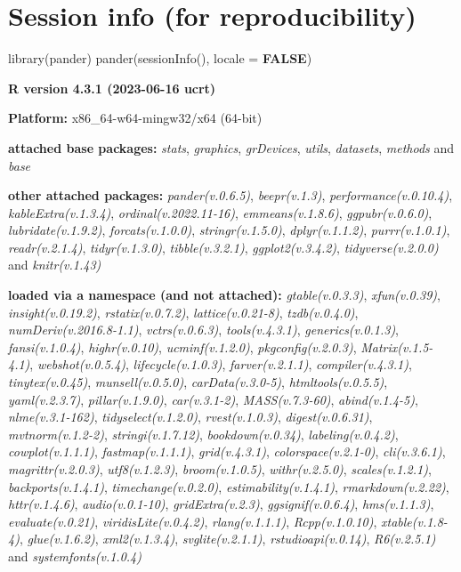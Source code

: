 \documentclass[
  bookmarksnumbered]{article}
\newenvironment{Shaded}{\begin{snugshade}}{\end{snugshade}}
\newcommand{\AttributeTok}[1]{\textcolor[rgb]{0.80,0.80,0.80}{#1}}
\newcommand{\ConstantTok}[1]{\textcolor[rgb]{0.86,0.64,0.64}{\textbf{#1}}}
\newcommand{\FunctionTok}[1]{\textcolor[rgb]{0.94,0.94,0.56}{#1}}
\newcommand{\NormalTok}[1]{\textcolor[rgb]{0.80,0.80,0.80}{#1}}
\begin{document}
\hypertarget{session}{%
\section{Session info (for reproducibility)}\label{session}}

\begin{Shaded}
\begin{Highlighting}[]
\FunctionTok{library}\NormalTok{(pander)}
\FunctionTok{pander}\NormalTok{(}\FunctionTok{sessionInfo}\NormalTok{(), }\AttributeTok{locale =} \ConstantTok{FALSE}\NormalTok{)}
\end{Highlighting}
\end{Shaded}

\textbf{R version 4.3.1 (2023-06-16 ucrt)}

\textbf{Platform:} x86\_64-w64-mingw32/x64 (64-bit)

\textbf{attached base packages:}
\emph{stats}, \emph{graphics}, \emph{grDevices}, \emph{utils}, \emph{datasets}, \emph{methods} and \emph{base}

\textbf{other attached packages:}
\emph{pander(v.0.6.5)}, \emph{beepr(v.1.3)}, \emph{performance(v.0.10.4)}, \emph{kableExtra(v.1.3.4)}, \emph{ordinal(v.2022.11-16)}, \emph{emmeans(v.1.8.6)}, \emph{ggpubr(v.0.6.0)}, \emph{lubridate(v.1.9.2)}, \emph{forcats(v.1.0.0)}, \emph{stringr(v.1.5.0)}, \emph{dplyr(v.1.1.2)}, \emph{purrr(v.1.0.1)}, \emph{readr(v.2.1.4)}, \emph{tidyr(v.1.3.0)}, \emph{tibble(v.3.2.1)}, \emph{ggplot2(v.3.4.2)}, \emph{tidyverse(v.2.0.0)} and \emph{knitr(v.1.43)}

\textbf{loaded via a namespace (and not attached):}
\emph{gtable(v.0.3.3)}, \emph{xfun(v.0.39)}, \emph{insight(v.0.19.2)}, \emph{rstatix(v.0.7.2)}, \emph{lattice(v.0.21-8)}, \emph{tzdb(v.0.4.0)}, \emph{numDeriv(v.2016.8-1.1)}, \emph{vctrs(v.0.6.3)}, \emph{tools(v.4.3.1)}, \emph{generics(v.0.1.3)}, \emph{fansi(v.1.0.4)}, \emph{highr(v.0.10)}, \emph{ucminf(v.1.2.0)}, \emph{pkgconfig(v.2.0.3)}, \emph{Matrix(v.1.5-4.1)}, \emph{webshot(v.0.5.4)}, \emph{lifecycle(v.1.0.3)}, \emph{farver(v.2.1.1)}, \emph{compiler(v.4.3.1)}, \emph{tinytex(v.0.45)}, \emph{munsell(v.0.5.0)}, \emph{carData(v.3.0-5)}, \emph{htmltools(v.0.5.5)}, \emph{yaml(v.2.3.7)}, \emph{pillar(v.1.9.0)}, \emph{car(v.3.1-2)}, \emph{MASS(v.7.3-60)}, \emph{abind(v.1.4-5)}, \emph{nlme(v.3.1-162)}, \emph{tidyselect(v.1.2.0)}, \emph{rvest(v.1.0.3)}, \emph{digest(v.0.6.31)}, \emph{mvtnorm(v.1.2-2)}, \emph{stringi(v.1.7.12)}, \emph{bookdown(v.0.34)}, \emph{labeling(v.0.4.2)}, \emph{cowplot(v.1.1.1)}, \emph{fastmap(v.1.1.1)}, \emph{grid(v.4.3.1)}, \emph{colorspace(v.2.1-0)}, \emph{cli(v.3.6.1)}, \emph{magrittr(v.2.0.3)}, \emph{utf8(v.1.2.3)}, \emph{broom(v.1.0.5)}, \emph{withr(v.2.5.0)}, \emph{scales(v.1.2.1)}, \emph{backports(v.1.4.1)}, \emph{timechange(v.0.2.0)}, \emph{estimability(v.1.4.1)}, \emph{rmarkdown(v.2.22)}, \emph{httr(v.1.4.6)}, \emph{audio(v.0.1-10)}, \emph{gridExtra(v.2.3)}, \emph{ggsignif(v.0.6.4)}, \emph{hms(v.1.1.3)}, \emph{evaluate(v.0.21)}, \emph{viridisLite(v.0.4.2)}, \emph{rlang(v.1.1.1)}, \emph{Rcpp(v.1.0.10)}, \emph{xtable(v.1.8-4)}, \emph{glue(v.1.6.2)}, \emph{xml2(v.1.3.4)}, \emph{svglite(v.2.1.1)}, \emph{rstudioapi(v.0.14)}, \emph{R6(v.2.5.1)} and \emph{systemfonts(v.1.0.4)}
\end{document}
